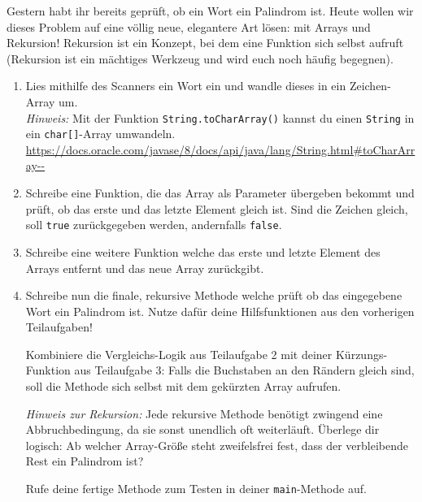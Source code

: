 \documentclass{../../sheet}
\begin{document}
\newpage
{}
Gestern habt ihr bereits geprüft, ob ein Wort ein Palindrom ist. Heute wollen wir dieses Problem auf eine völlig neue, elegantere Art lösen: mit Arrays und Rekursion! Rekursion ist ein Konzept, bei dem eine Funktion sich selbst aufruft (Rekursion ist ein mächtiges Werkzeug und wird euch noch häufig begegnen).
\begin{enumerate}
    \item Lies mithilfe des Scanners ein Wort ein und wandle dieses in ein Zeichen-Array um. \\
    \textit{Hinweis:} Mit der Funktion \texttt{String.toCharArray()} kannst du einen \texttt{String} in ein \texttt{char[]}-Array umwandeln. \\
    \url{https://docs.oracle.com/javase/8/docs/api/java/lang/String.html#toCharArray--}
    \item Schreibe eine Funktion, die das Array als Parameter übergeben bekommt und prüft, ob das erste und das letzte Element gleich ist. Sind die Zeichen gleich, soll \texttt{true} zurückgegeben werden, andernfalls \texttt{false}.
    \item Schreibe eine weitere Funktion welche das erste und letzte Element des Arrays entfernt und das neue Array zurückgibt.
    \item Schreibe nun die finale, rekursive Methode welche prüft ob das eingegebene Wort ein Palindrom ist. Nutze dafür deine Hilfsfunktionen aus den vorherigen Teilaufgaben!
    
Kombiniere die Vergleichs-Logik aus Teilaufgabe 2 mit deiner Kürzungs-Funktion aus Teilaufgabe 3: Falls die Buchstaben an den Rändern gleich sind, soll die Methode sich selbst mit dem gekürzten Array aufrufen. 
    
\textit{Hinweis zur Rekursion:} Jede rekursive Methode benötigt zwingend eine Abbruchbedingung, da sie sonst unendlich oft weiterläuft. Überlege dir logisch: Ab welcher Array-Größe steht zweifelsfrei fest, dass der verbleibende Rest ein Palindrom ist?
    
Rufe deine fertige Methode zum Testen in deiner \texttt{main}-Methode auf.
\end{enumerate}
\end{document}
